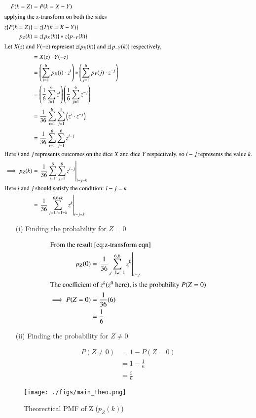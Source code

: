 \documentclass[journal,12pt,twocolumn]{IEEEtran}
\theoremstyle{remark}
\begin{document}
\begin{align}
	P(k=Z) &= P(k=X-Y)\\
	\intertext{applying the z-transform on both the sides}
	z\{P(k=Z)\} &= z\{P(k=X-Y)\}\\
	p_Z(k) &= z\{p_X(k)\}*z\{p_{-Y}(k)\}\\ \intertext{Let $X(z)$ and $Y(-z)$ represent $z\{p_X(k)\}$ and $z\{p_{-Y}(k)\}$ respectively,}
	&= X(z)\cdot Y(-z)\\
	&= \left(\sum^6_{i=1}p_X(i)\cdot z^i\right)*\left(\sum^6_{j=1}p_Y(j)\cdot z^{-j}\right)\\
	&= \left(\frac{1}{6}\sum^6_{i=1}z^i\right)\left(\frac{1}{6}\sum^6_{j=1}z^{-j}\right)\\
	&= \frac{1}{36}\sum^6_{i=1}\sum^1_{j=1}\left(z^i\cdot z^{-j}\right)\\
	&= \frac{1}{36}\sum^6_{i=1}\sum^6_{j=1}z^{i-j}\\
	\intertext{Here $i$ and $j$ represents outcomes on the dice $X$ and dice $Y$ respectively, so $i-j$ represents the value $k$.}
	\implies p_Z(k) &= \left. \frac{1}{36}\sum^6_{i=1}\sum^6_{j=1}z^{i-j} \right|_{i-j=k}\\
	\intertext{Here $i$ and $j$ should satisfy the condition: $i-j = k$}
	&= \left. \frac{1}{36}\sum^{6,6+k}_{j=1,i=1+k}z^{k}\right|_{i-j=k} \label{eq:z-transform eqn}
\end{align}
\begin{enumerate}
\item[(i)] Finding the probability for $Z = 0$
\end{enumerate}
\begin{align}
	\intertext{From the result $\eqref{eq:z-transform eqn}$}
	p_Z(0) &= \left. \frac{1}{36}\sum^{6,6}_{j=1,i=1}z^{0}\right|_{i=j}\\
	\intertext{The coefficient of $z^k (z^0$ here), is the probability $P(Z=0)$}
	\implies P(Z=0) &= \frac{1}{36}(6)\\
	&= \frac{1}{6}
\end{align}
\begin{enumerate}
\item[(ii)] Finding the probability for $Z \neq 0$
\end{enumerate}
\begin{align}
	P(Z \neq 0) &= 1-P(Z=0)\\
	&= 1-\frac{1}{6}\\
	&= \frac{5}{6}
\end{align}
\newpage
\begin{figure}
\centering
\texttt{[image: ./figs/main\_theo.png]}
\caption{Theorectical PMF of Z ($p_Z(k)$)}
\label{fig:theo_pmf(Z)}
\end{figure}
\end{document}
